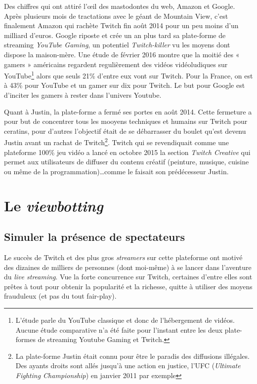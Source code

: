 \documentclass[a4paper]{article}
\begin{document}
Des chiffres qui ont attiré l'\oe{}il des mastodontes du web, Amazon et Google. Après plusieurs mois de tractations avec le géant de Mountain View, c'est finalement Amazon qui rachète Twitch fin août 2014 pour un peu moins d'un milliard d'euros. Google riposte et crée un an plus tard sa plate-forme de streaming \textit{YouTube Gaming}, un potentiel \textit{Twitch-killer} vu les moyens dont dispose la maison-mère\cite{Echos2015}. Une étude de février 2016 montre que la moitié des « gamers » américains regardent regulièrement des vidéos vidéoludiques sur YouTube\footnote{L'étude parle du YouTube classique et donc de l'hébergement de vidéos. Aucune étude comparative n'a été faite pour l'instant entre les deux plate-formes de streaming Youtube Gaming et Twitch.} alors que seuls 21\% d'entre eux vont sur Twitch. Pour la France, on est à 43\% pour YouTube et un gamer sur dix pour Twitch\cite{Newzoo2016}. Le but pour Google est d'inciter les gamers à rester dans l'univers Youtube.

Quant à Justin, la plate-forme a fermé ses portes en août 2014. Cette fermeture a pour but de concentrer tous les mooyens techniques et humains sur Twitch pour ceratins, pour d'autres l'objectif était de se débarrasser du boulet qu'est devenu Justin avant un rachat de Twitch\footnote{La plate-forme Justin était connu pour être le paradis des diffusions illégales. Des ayants droits sont allés jusqu'à une action en justice, l'UFC (\textit{Ultimate Fighting Championship}) en janvier 2011 par exemple}. Twitch qui se revendiquait comme une plateforme 100\% jeu vidéo a lancé en octobre 2015 la section \textit{Twitch Creative} qui permet aux utilisateurs de diffuser du contenu créatif (peinture, musique, cuisine ou même de la programmation)\ldots comme le faisait son prédécesseur Justin. 
\newpage 
\section{Le \textit{viewbotting}}

\subsection{Simuler la présence de spectateurs}

Le succès de Twitch et des plus gros \textit{streamers} sur cette plateforme ont motivé des dizaines de milliers de personnes (dont moi-même) à se lancer dans l'aventure du \textit{live streaming}. Vue la forte concurrence sur Twitch, certaines d'entre elles sont prêtes à tout pour obtenir la popularité et la richesse, quitte à utiliser des moyens frauduleux (et pas du tout fair-play).
\end{document}
